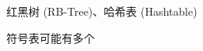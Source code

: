 \begin{frame}{}

  \vspace{0.50cm}
  \begin{center}
    红黑树 (RB-Tree)、哈希表 (Hashtable)
  \end{center}
\end{frame}

\begin{frame}{}
  \begin{center}
    符号表可能有多个
  \end{center}

\end{frame}
